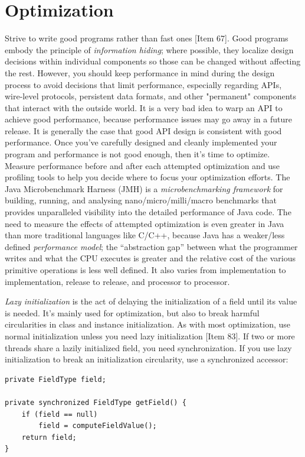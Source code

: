 \documentclass[table, xcdraw]{article}%
\begin{document}
\section{Optimization}

Strive to write good programs rather than fast ones [Item 67]. Good programs embody the principle of \emph{information hiding}; where possible, they localize design decisions within individual components so those can be changed without affecting the rest. However, you should keep performance in mind during the design process to avoid decisions that limit performance, especially regarding APIs, wire-level protocols, persistent data formats, and other "permanent" components that interact with the outside world. It is a very bad idea to warp an API to achieve good performance, because performance issues may go away in a future release. It is generally the case that good API design is consistent with good performance. Once you’ve carefully designed and cleanly implemented your program and performance is not good enough, then it's time to optimize. Measure performance before and after each attempted optimization and use profiling tools to help you decide where to focus your optimization efforts. The Java Microbenchmark Harness (JMH) is a \emph{microbenchmarking framework} for building, running, and analysing nano/micro/milli/macro benchmarks that provides unparalleled visibility into the detailed performance of Java code. The need to measure the effects of attempted optimization is even greater in Java than more traditional languages like C/C++, because Java has a weaker/less defined \emph{performance model}; the “abstraction gap” between what the programmer writes and
what the CPU executes is greater and the relative cost of the various primitive operations is less well defined. It also varies from
implementation to implementation, release to release, and processor to processor.

\emph{Lazy initialization} is the act of delaying the initialization of a field until its value is needed. It's mainly used for optimization, but also to break harmful circularities in class and instance initialization. As with most optimization, use normal initialization unless you need lazy initialization [Item 83]. If two or more threads share a lazily initialized field, you need synchronization. If you use lazy initialization to break an initialization circularity, use a synchronized accessor:

\begin{verbatim}
private FieldType field;

private synchronized FieldType getField() {
    if (field == null)
        field = computeFieldValue();
    return field;
}
\end{verbatim}
\end{document}
